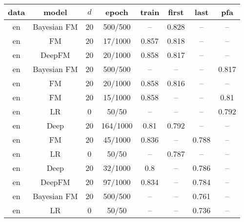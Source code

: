 \begin{tabular}{cccccccc}
\toprule
data &        model &  $d$ &     epoch &  train &  first &   last &    pfa \\
\midrule
  en &  Bayesian FM &   20 &   500/500 &     -- &  0.828 &     -- &     -- \\
  en &           FM &   20 &   17/1000 &  0.857 &  0.818 &     -- &     -- \\
  en &       DeepFM &   20 &   20/1000 &  0.858 &  0.817 &     -- &     -- \\
  en &  Bayesian FM &   20 &   500/500 &     -- &     -- &     -- &  0.817 \\
  en &           FM &   20 &   20/1000 &  0.858 &  0.816 &     -- &     -- \\
  en &           FM &   20 &   15/1000 &  0.858 &     -- &     -- &   0.81 \\
  en &           LR &    0 &     50/50 &     -- &     -- &     -- &  0.792 \\
  en &         Deep &   20 &  164/1000 &   0.81 &  0.792 &     -- &     -- \\
  en &           FM &   20 &   45/1000 &  0.836 &     -- &  0.788 &     -- \\
  en &           LR &    0 &     50/50 &     -- &  0.787 &     -- &     -- \\
  en &         Deep &   20 &   32/1000 &    0.8 &     -- &  0.786 &     -- \\
  en &       DeepFM &   20 &   97/1000 &  0.834 &     -- &  0.784 &     -- \\
  en &  Bayesian FM &   20 &   500/500 &     -- &     -- &  0.761 &     -- \\
  en &           LR &    0 &     50/50 &     -- &     -- &  0.736 &     -- \\
\bottomrule
\end{tabular}
